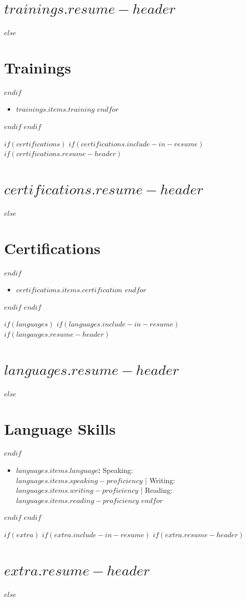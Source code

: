 \documentclass[letterpaper,10pt,final,sans]{moderncv}
\begin{document}
\section{$trainings.resume-header$}
$else$
\section{Trainings}
$endif$
\small
\begin{itemize}
$for(trainings.items)$
\item $trainings.items.training$
$endfor$
\end{itemize}
$endif$
$endif$

$if(certifications)$
$if(certifications.include-in-resume)$
$if(certifications.resume-header)$
\section{$certifications.resume-header$}
$else$
\section{Certifications}
$endif$
\small
\begin{itemize}
$for(certifications.items)$
\item $certifications.items.certification$
$endfor$
\end{itemize}
$endif$
$endif$

$if(languages)$
$if(languages.include-in-resume)$
$if(langauges.resume-header)$
\section{$languages.resume-header$}
$else$
\section{Language Skills}
$endif$
\small
\begin{itemize}
$for(languages.items)$
\item \textbf{$languages.items.language$:} Speaking: $languages.items.speaking-proficiency$ | Writing: $languages.items.writing-proficiency$ | Reading: $languages.items.reading-proficiency$
$endfor$
\end{itemize}
$endif$
$endif$

$if(extra)$
$if(extra.include-in-resume)$
$if(extra.resume-header)$
\section{$extra.resume-header$}
$else$
\end{document}
